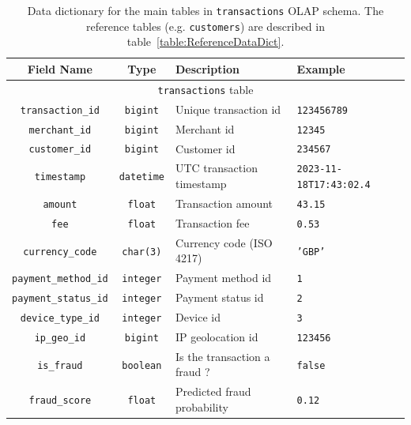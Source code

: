\documentclass[11pt,a4paper,computermodern]{article}
\newcommand{\code}{\texttt}
\begin{document}
\begin{table}[!htb]
	\centering
	\begin{threeparttable}
		\caption{Data dictionary for the main tables in \code{transactions} OLAP schema. The reference tables (e.g. \code{customers}) are described in table~\ref{table:ReferenceDataDict}.}
		\label{table:OLAPDataDict}
		\begin{tabularx}{0.99\textwidth}{c c >{\centering\arraybackslash}X >{\centering\arraybackslash}X}
			\toprule
			Field Name & Type & Description & Example  \\
			\midrule
			\multicolumn{4}{c}{\code{transactions} table}\\
			\code{transaction\_id} & \code{bigint} & Unique transaction id & \code{123456789} \\
			\code{merchant\_id} & \code{bigint} & Merchant id & \code{12345} \\
			\code{customer\_id} & \code{bigint} & Customer id & \code{234567} \\
			\code{timestamp} & \code{datetime} & UTC transaction timestamp & \code{2023-11-18T17:43:02.4} \\
			\code{amount} & \code{float} & Transaction amount & \code{43.15} \\
			\code{fee} & \code{float} & Transaction fee & \code{0.53} \\
			\code{currency\_code} & \code{char(3)} & Currency code (ISO 4217) & \code{'GBP'} \\
			\code{payment\_method\_id} & \code{integer} & Payment method id & \code{1} \\
			\code{payment\_status\_id} & \code{integer} & Payment status id & \code{2} \\
			\code{device\_type\_id} & \code{integer} & Device id & \code{3} \\
			\code{ip\_geo\_id} & \code{bigint} & IP geolocation id & \code{123456} \\
			\code{is\_fraud} & \code{boolean} & Is the transaction a fraud ? & \code{false} \\
			\code{fraud\_score} & \code{float} & Predicted fraud probability & \code{0.12} \\
			

\end{tabularx}
\end{threeparttable}
\end{table}
\end{document}
